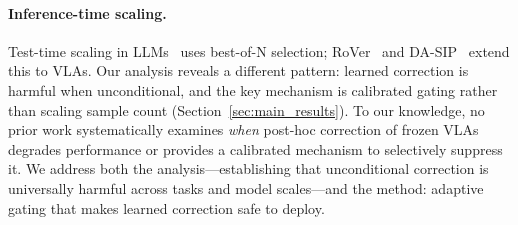 \paragraph{Inference-time scaling.} Test-time scaling in LLMs~\cite{snell2024scaling} uses best-of-N selection; RoVer~\cite{dai2025rover} and DA-SIP~\cite{chun2025dasip} extend this to VLAs. Our analysis reveals a different pattern: learned correction is harmful when unconditional, and the key mechanism is calibrated gating rather than scaling sample count (Section~\ref{sec:main_results}). To our knowledge, no prior work systematically examines \emph{when} post-hoc correction of frozen VLAs degrades performance or provides a calibrated mechanism to selectively suppress it. We address both the analysis---establishing that unconditional correction is universally harmful across tasks and model scales---and the method: adaptive gating that makes learned correction safe to deploy.

